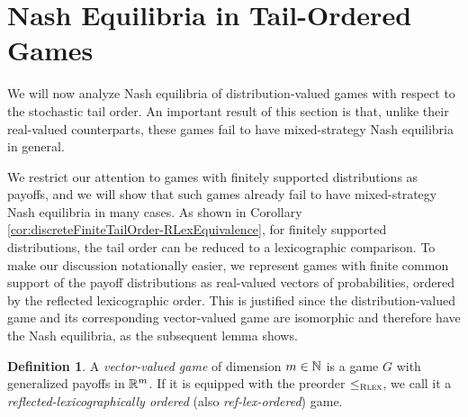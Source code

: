 \documentclass[a4paper]{scrreprt}
\theoremstyle{definition}
\newtheorem{defn}[thm]{Definition} %
\begin{document}
%    
     
    
    \section{Nash Equilibria in Tail-Ordered Games}
    We will now analyze Nash equilibria of distribution-valued games with respect to the stochastic tail order.
    An important result of this section is that, unlike their real-valued counterparts, these games fail to have mixed-strategy Nash equilibria in general.
    
    We restrict our attention to games with finitely supported distributions as payoffs, and we will show that such games already fail to have mixed-strategy Nash equilibria in many cases.
    As shown in Corollary \ref{cor:discreteFiniteTailOrder-RLexEquivalence}, for finitely supported distributions, the tail order can be reduced to a lexicographic comparison.
    To make our discussion notationally easier, we represent games with finite common support of the payoff distributions as real-valued vectors of probabilities, ordered by the reflected lexicographic order. This is justified since the distribution-valued game and its corresponding vector-valued game are isomorphic and therefore have the Nash equilibria, as the subsequent lemma shows.
    \begin{defn}
        A \emph{vector-valued game} of dimension $m \in \mathbb{N}$ is a game $G$ with generalized payoffs in $\mathbb{R}^m$.
        If it is equipped with the preorder $\leq_{\textsc{Rlex}}$, we call it a \emph{reflected-lexicographically ordered} (also \emph{ref-lex-ordered}) game.
    \end{defn}
\end{document}
